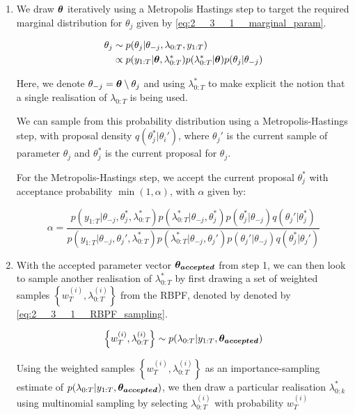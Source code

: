 \documentclass[../main.tex]{subfiles}
\begin{document}
\begin{enumerate}
	\item We draw $\bm{\theta}$ iteratively using a Metropolis Hastings step to target the required marginal distribution for $\theta_j$ given by \autoref{eq:2__3__1__marginal_param}. 
	
	\begin{align}
		\theta_j &\sim p(\theta_j | \theta_{-j}, \lambda_{0:T}, y_{1:T}    ) \notag\\
		&\propto p(y_{1:T} | \bm{\theta}, \lambda_{0:T}^* ) p(\lambda_{0:T}^* | \bm{\theta}) p(\theta_j | \theta_{-j} )
		\label{eq:2__3__1__marginal_param}
	\end{align}
	
	Here, we denote $\theta_{-j} = \bm{\theta} \setminus  \theta_j$ and using $\lambda_{0:T}^*$ to make explicit the notion that a single realisation of $\lambda_{0:T}$ is being used.
	
	We can sample from this probability distribution using a Metropolis-Hastings step, with proposal density $q(\theta_j^* | \theta_i')$, where $\theta_j'$ is the current sample of parameter $\theta_j$ and $\theta_j^*$ is the current proposal for $\theta_j$. 
	
	For the Metropolis-Hastings step, we accept the current proposal $\theta_j^*$ with acceptance probability $\min(1, \alpha)$, with $\alpha$ given by: 
	
	\begin{equation}
		\alpha = \frac{p(y_{1:T} | \theta_{-j}, \theta_j^*,  \lambda_{0:T}^* ) p(\lambda_{0:T}^* | \theta_{-j}, \theta_j^* ) p(\theta_j^* | \theta_{-j} ) q(\theta_j' | \theta_j^*)  } {   p(y_{1:T} | \theta_{-j}, \theta_j',  \lambda_{0:T}^* ) p(\lambda_{0:T}^* | \theta_{-j}, \theta_j' ) p(\theta_j' | \theta_{-j} ) q(\theta_j^* | \theta_j')  }
	\end{equation}
	
	\item With the accepted parameter vector $\bm{\theta_{accepted}}$  from step 1, we can then look to sample another realisation of $\lambda_{0:T}^*$ by first drawing a set of weighted samples $\left\{ w_T^{(i)} , \lambda_{0:T}^{(i)} \right\}$ from  the RBPF, denoted by denoted by \autoref{eq:2__3__1__RBPF_sampling}. 
	
	\begin{equation}
		 \left\{ w_T^{(i)} , \lambda_{0:T}^{(i)} \right\}  \sim p(\lambda_{0:T} | y_{1:T}, \bm{\theta_{accepted}})
		 \label{eq:2__3__1__RBPF_sampling}
	\end{equation}
	
	Using the weighted samples $\left\{ w_T^{(i)} , \lambda_{0:T}^{(i)} \right\}$ as an importance-sampling estimate of $p(\lambda_{0:T} | y_{1:T}, \bm{\theta_{accepted}}   )$, we then draw a particular realisation $\lambda_{0:k}^*$ using multinomial sampling by selecting $\lambda_{0:T}^{(i)}$ with probability $w_T^{(i)}$
	
\end{enumerate}
\end{document}
